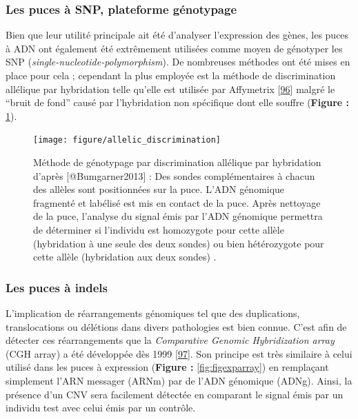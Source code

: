 \documentclass[12pt,twoside]{reedthesis}
\theoremstyle{definition}
\theoremstyle{definition}
\theoremstyle{remark}
\begin{document}
  \newpage
  
  \subsubsection{Les puces à SNP, plateforme
  génotypage}\label{les-puces-a-snp-plateforme-genotypage}
  
  Bien que leur utilité principale ait été d'analyser l'expression des
  gènes, les puces à ADN ont également été extrêmement utilisées comme
  moyen de génotyper les SNP (\emph{single-nucleotide-polymorphism}). De
  nombreuses méthodes ont été mises en place pour cela ; cependant la plus
  employée est la méthode de discrimination allélique par hybridation
  telle qu'elle est utilisée par Affymetrix
  {[}\protect\hyperlink{ref-Wang1998}{96}{]} malgré le ``bruit de fond''
  causé par l'hybridation non spécifique dont elle souffre (\textbf{Figure
  :} \ref{fig:figallelicdisc}).
  
  \begin{figure}
  
  {\centering \texttt{[image: figure/allelic\_discrimination]} 
  
  }
  
  \caption[Méthode de génotypage par discrimination allélique par hybridation]{Méthode de génotypage par discrimination allélique par hybridation d'après [@Bumgarner2013] : Des sondes complémentaires à chacun des allèles sont positionnées sur la puce. L'ADN génomique fragmenté et labélisé est mis en contact de la puce. Après nettoyage de la puce, l'analyse du signal émis par l'ADN génomique permettra de déterminer si l'individu est homozygote pour cette allèle (hybridation à une seule des deux sondes) ou bien hétérozygote pour cette allèle (hybridation aux deux sondes) .}\label{fig:figallelicdisc}
  \end{figure}
  
  \newpage
  
  \subsubsection{Les puces à indels}\label{les-puces-a-indels}
  
  L'implication de réarrangements génomiques tel que des duplications,
  translocations ou délétions dans divers pathologies est bien connue.
  C'est afin de détecter ces réarrangements que la \emph{Comparative
  Genomic Hybridization array} (CGH array) a été développée dès 1999
  {[}\protect\hyperlink{ref-Brown1999}{97}{]}. Son principe est très
  similaire à celui utilisé dans les puces à expression (\textbf{Figure :}
  \ref{fig:figexparray}) en remplaçant simplement l'ARN messager (ARNm)
  par de l'ADN génomique (ADNg). Ainsi, la présence d'un CNV sera
  facilement détectée en comparant le signal émis par un individu test
  avec celui émis par un contrôle.
  
\end{document}
